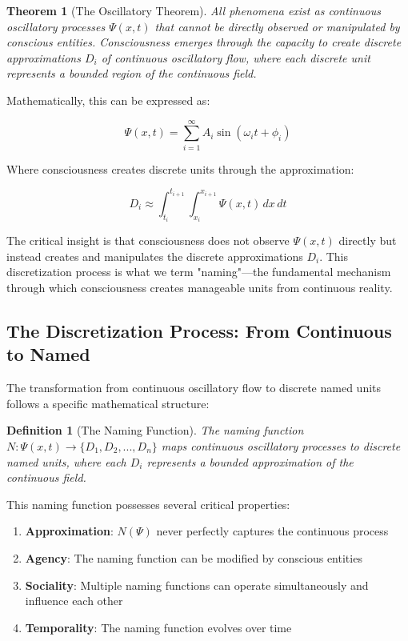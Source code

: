 \documentclass[12pt]{article}
\newtheorem{theorem}{Theorem}
\newtheorem{definition}{Definition}
\begin{document}
\begin{theorem}[The Oscillatory Theorem]
All phenomena exist as continuous oscillatory processes $\Psi(x,t)$ that cannot be directly observed or manipulated by conscious entities. Consciousness emerges through the capacity to create discrete approximations $D_i$ of continuous oscillatory flow, where each discrete unit represents a bounded region of the continuous field.
\end{theorem}

Mathematically, this can be expressed as:

$$\Psi(x,t) = \sum_{i=1}^{\infty} A_i \sin(\omega_i t + \phi_i)$$

Where consciousness creates discrete units through the approximation:

$$D_i \approx \int_{t_i}^{t_{i+1}} \int_{x_i}^{x_{i+1}} \Psi(x,t) \, dx \, dt$$

The critical insight is that consciousness does not observe $\Psi(x,t)$ directly but instead creates and manipulates the discrete approximations $D_i$. This discretization process is what we term "naming"—the fundamental mechanism through which consciousness creates manageable units from continuous reality.

\subsection{The Discretization Process: From Continuous to Named}

The transformation from continuous oscillatory flow to discrete named units follows a specific mathematical structure:

\begin{definition}[The Naming Function]
The naming function $N: \Psi(x,t) \rightarrow \{D_1, D_2, ..., D_n\}$ maps continuous oscillatory processes to discrete named units, where each $D_i$ represents a bounded approximation of the continuous field.
\end{definition}

This naming function possesses several critical properties:

\begin{enumerate}
\item \textbf{Approximation}: $N(\Psi)$ never perfectly captures the continuous process
\item \textbf{Agency}: The naming function can be modified by conscious entities
\item \textbf{Sociality}: Multiple naming functions can operate simultaneously and influence each other
\item \textbf{Temporality}: The naming function evolves over time
\end{enumerate}
\end{document}
